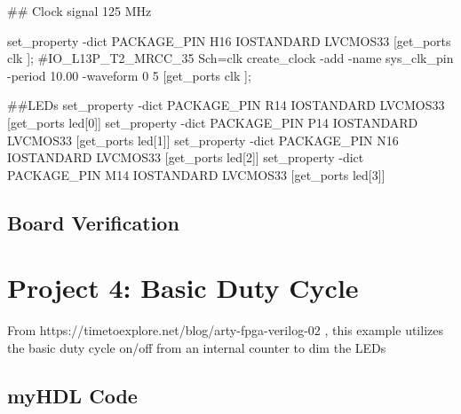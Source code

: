 \documentclass[11pt]{article}
\begin{document}
## Clock signal 125 MHz

set_property -dict { PACKAGE_PIN H16   IOSTANDARD LVCMOS33 } [get_ports { clk }]; #IO_L13P_T2_MRCC_35 Sch=clk
create_clock -add -name sys_clk_pin -period 10.00 -waveform {0 5} [get_ports { clk }];



##LEDs
set_property -dict {PACKAGE_PIN R14 IOSTANDARD LVCMOS33} [get_ports {led[0]}]
set_property -dict {PACKAGE_PIN P14 IOSTANDARD LVCMOS33} [get_ports {led[1]}]
set_property -dict {PACKAGE_PIN N16 IOSTANDARD LVCMOS33} [get_ports {led[2]}]
set_property -dict {PACKAGE_PIN M14 IOSTANDARD LVCMOS33} [get_ports {led[3]}]
    \subsection{Board Verification}\label{board-verification}

    \section{Project 4: Basic Duty Cycle}\label{project-4-basic-duty-cycle}

From https://timetoexplore.net/blog/arty-fpga-verilog-02 , this example
utilizes the basic duty cycle on/off from an internal counter to dim the
LEDs

    \subsection{myHDL Code}\label{myhdl-code}
\end{document}
